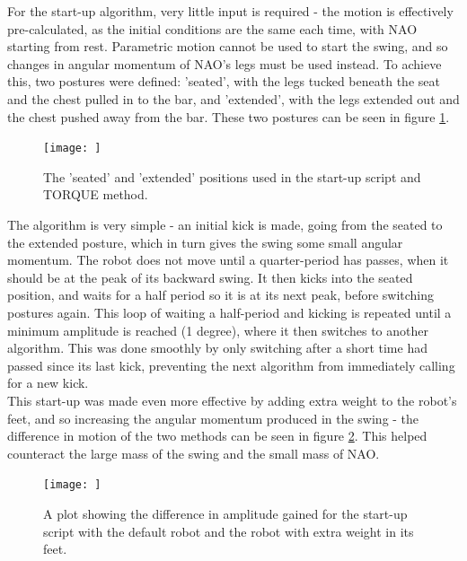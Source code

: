 \documentclass[11pt]{article}
\begin{document}
For the start-up algorithm, very little input is required - the motion is effectively pre-calculated, as the initial conditions are the same each time, with NAO starting from rest. Parametric motion cannot be used to start the swing, and so changes in angular momentum of NAO's legs must be used instead. To achieve this, two postures were defined: 'seated', with the legs tucked beneath the seat and the chest pulled in to the bar, and 'extended', with the legs extended out and the chest pushed away from the bar. These two postures can be seen in figure \ref{fig:seatedextended}.\\

    \begin{figure}
        \centering
        \texttt{[image: ]}
        \caption{The 'seated' and 'extended' positions used in the start-up script and TORQUE method.}
        \label{fig:seatedextended}
    \end{figure}

The algorithm is very simple - an initial kick is made, going from the seated to the extended posture, which in turn gives the swing some small angular momentum. The robot does not move until a quarter-period has passes, when it should be at the peak of its backward swing. It then kicks into the seated position, and waits for a half period so it is at its next peak, before switching postures again. This loop of waiting a half-period and kicking is repeated until a minimum amplitude is reached (1 degree), where it then switches to another algorithm. This was done smoothly by only switching after a short time had passed since its last kick, preventing the next algorithm from immediately calling for a new kick.\\

This start-up was made even more effective by adding extra weight to the robot's feet, and so increasing the angular momentum produced in the swing - the difference in motion of the two methods can be seen in figure \ref{fig:startupcomparison}. This helped counteract the large mass of the swing and the small mass of NAO.


    \begin{figure}
        \centering
        \texttt{[image: ]}
        \caption{A plot showing the difference in amplitude gained for the start-up script with the default robot and the robot with extra weight in its feet.}
        \label{fig:startupcomparison}
    \end{figure}
\end{document}
